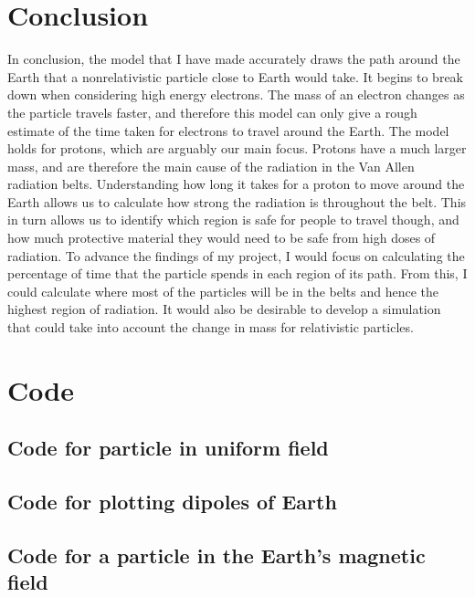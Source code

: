 \documentclass[14paper,11pt,hidelinks]{article}
\begin{document}
\section{Conclusion}
In conclusion, the model that I have made accurately draws the path around the Earth that a nonrelativistic particle close to Earth would take. It begins to break down when considering high energy electrons. The mass of an electron changes as the particle travels faster, and therefore this model can only give a rough estimate of the time taken for electrons to travel around the Earth.
\newline 
\newline
The model holds for protons, which are arguably our main focus. Protons have a much larger mass, and are therefore the main cause of the radiation in the Van Allen radiation belts. Understanding how long it takes for a proton to move around the Earth allows us to calculate how strong the radiation is throughout the belt. This in turn allows us to identify which region is safe for people to travel though, and how much protective material they would need to be safe from high doses of radiation.
\newline
\newline
To advance the findings of my project, I would focus on calculating the percentage of time that the particle spends in each region of its path. From this, I could calculate where most of the particles will be in the belts and hence the highest region of radiation. It would also be desirable to develop a simulation that could take into account the change in mass for relativistic particles.
\pagebreak

\section{Code}
\subsection{Code for particle in uniform field}

\subsection{Code for plotting dipoles of Earth}

\subsection{Code for a particle in the Earth's magnetic field}

\end{document}
